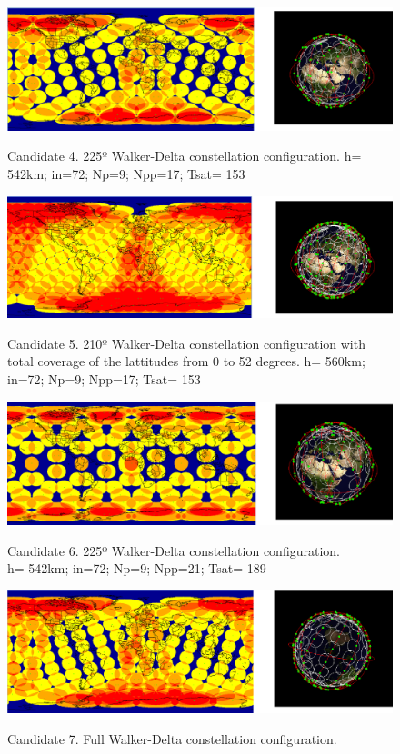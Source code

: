 \begin{figure}%
	\centering
	\includegraphics[width=1\textwidth]{Candidate4.png}\\
	\caption{Candidate 4. 225º Walker-Delta constellation configuration.
			 h= 542km; in=72; Np=9; Npp=17; Tsat= 153}
	\label{fig:Candidate4}
\end{figure}

\begin{figure}%
	\centering
	\includegraphics[width=1\textwidth]{Candidate5.png}\\
	\caption{Candidate 5. 210º Walker-Delta constellation configuration with total coverage of the lattitudes from 0 to 52 degrees.
			 h= 560km; in=72; Np=9; Npp=17; Tsat= 153} 
	\label{fig:Candidate5}
\end{figure}

\begin{figure}%
	\centering
	\includegraphics[width=1\textwidth]{Candidate6.png}\\
	\caption{Candidate 6. 225º Walker-Delta constellation configuration.\\
			 h= 542km; in=72; Np=9; Npp=21; Tsat= 189}
	\label{fig:Candidate6}
\end{figure}

\begin{figure}%
	\centering
	\includegraphics[width=1\textwidth]{Candidate7.png}\\
	\caption{Candidate 7. Full Walker-Delta constellation configuration.}
	\label{fig:Candidate7}
\end{figure}


